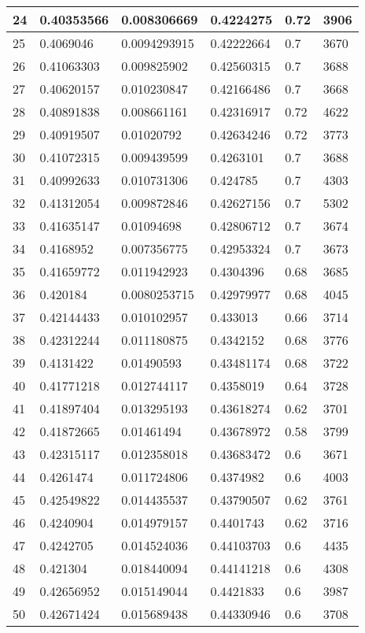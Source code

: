 \begin{longtable}{|l|l|l|l|l|l|}
24 & 0.40353566 & 0.008306669 & 0.4224275 & 0.72 & 3906 \\ \hline 
25 & 0.4069046 & 0.0094293915 & 0.42222664 & 0.7 & 3670 \\ \hline 
26 & 0.41063303 & 0.009825902 & 0.42560315 & 0.7 & 3688 \\ \hline 
27 & 0.40620157 & 0.010230847 & 0.42166486 & 0.7 & 3668 \\ \hline 
28 & 0.40891838 & 0.008661161 & 0.42316917 & 0.72 & 4622 \\ \hline 
29 & 0.40919507 & 0.01020792 & 0.42634246 & 0.72 & 3773 \\ \hline 
30 & 0.41072315 & 0.009439599 & 0.4263101 & 0.7 & 3688 \\ \hline 
31 & 0.40992633 & 0.010731306 & 0.424785 & 0.7 & 4303 \\ \hline 
32 & 0.41312054 & 0.009872846 & 0.42627156 & 0.7 & 5302 \\ \hline 
33 & 0.41635147 & 0.01094698 & 0.42806712 & 0.7 & 3674 \\ \hline 
34 & 0.4168952 & 0.007356775 & 0.42953324 & 0.7 & 3673 \\ \hline 
35 & 0.41659772 & 0.011942923 & 0.4304396 & 0.68 & 3685 \\ \hline 
36 & 0.420184 & 0.0080253715 & 0.42979977 & 0.68 & 4045 \\ \hline 
37 & 0.42144433 & 0.010102957 & 0.433013 & 0.66 & 3714 \\ \hline 
38 & 0.42312244 & 0.011180875 & 0.4342152 & 0.68 & 3776 \\ \hline 
39 & 0.4131422 & 0.01490593 & 0.43481174 & 0.68 & 3722 \\ \hline 
40 & 0.41771218 & 0.012744117 & 0.4358019 & 0.64 & 3728 \\ \hline 
41 & 0.41897404 & 0.013295193 & 0.43618274 & 0.62 & 3701 \\ \hline 
42 & 0.41872665 & 0.01461494 & 0.43678972 & 0.58 & 3799 \\ \hline 
43 & 0.42315117 & 0.012358018 & 0.43683472 & 0.6 & 3671 \\ \hline 
44 & 0.4261474 & 0.011724806 & 0.4374982 & 0.6 & 4003 \\ \hline 
45 & 0.42549822 & 0.014435537 & 0.43790507 & 0.62 & 3761 \\ \hline 
46 & 0.4240904 & 0.014979157 & 0.4401743 & 0.62 & 3716 \\ \hline 
47 & 0.4242705 & 0.014524036 & 0.44103703 & 0.6 & 4435 \\ \hline 
48 & 0.421304 & 0.018440094 & 0.44141218 & 0.6 & 4308 \\ \hline 
49 & 0.42656952 & 0.015149044 & 0.4421833 & 0.6 & 3987 \\ \hline 
50 & 0.42671424 & 0.015689438 & 0.44330946 & 0.6 & 3708 \\ \hline 
\end{longtable}